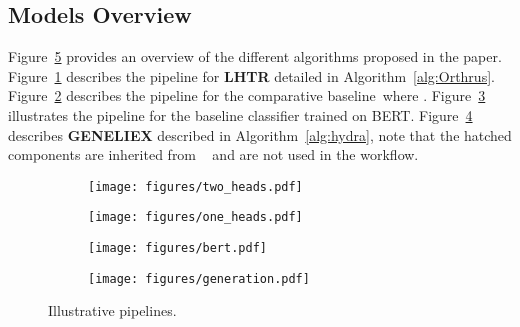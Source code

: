 \subsection{Models Overview}\label{sec:workflows} 
Figure~\ref{Fig:schema} provides an overview of the different algorithms proposed  in the paper. Figure~\ref{fig:two_heads} describes the pipeline for {\small\textbf{LHTR}} detailed in Algorithm~\ref{alg:Orthrus}. Figure~\ref{fig:one_head} describes the pipeline for the comparative baseline~\HTalgo  where . Figure~\ref{fig:baseline} illustrates the pipeline for the baseline classifier trained on BERT. Figure~\ref{fig:generation} describes  {\small\textbf{GENELIEX}} described in Algorithm~\ref{alg:hydra}, note that the hatched components are inherited from \HTalgo~ and are not used in the workflow.
\begin{figure}[h]{}
 \begin{subfigure}[t]{0.49\textwidth}
 \texttt{[image: figures/two\_heads.pdf]}
 \caption{}
   \label{fig:two_heads}
 \end{subfigure}
 \begin{subfigure}[t]{0.49\textwidth}
\texttt{[image: figures/one\_heads.pdf]}
   \caption{}
   \label{fig:one_head}
 \end{subfigure}
 \begin{subfigure}[t]{0.49\textwidth}
   \texttt{[image: figures/bert.pdf]}
   \caption{}
   \label{fig:baseline}
 \end{subfigure}
 \hfill
 \begin{subfigure}[t]{0.49\textwidth}
   \texttt{[image: figures/generation.pdf]}
   \caption{}
   \label{fig:generation}
 \end{subfigure}
 \caption{Illustrative pipelines.}
\label{Fig:schema}
 \end{figure}

